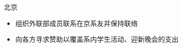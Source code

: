\documentclass[11pt,a4paper,sans]{moderncv/moderncv}
\begin{document}
{北京}{}
{
\begin{itemize}
	\item 组织外联部成员联系在京系友并保持联络
	\item 向各方寻求赞助以覆盖系内学生活动、迎新晚会的支出
\end{itemize}
}

% 
% 
% 
% 
% 
% 
\end{document}
